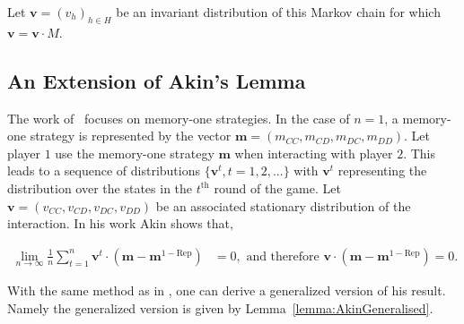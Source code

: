 \documentclass{article}
\theoremstyle{definition}
\begin{document}
Let $\mathbf{v}=(v_h)_{h\in H}$ be an invariant distribution of this Markov
chain for which $\mathbf{v} = \mathbf{v} \cdot M$.


\subsection{An Extension of Akin's Lemma}

The work of~\citep{akin:EGADS:2016} focuses on memory-one strategies. In the
case of $n=1$, a memory-one strategy is represented by the vector
\(\mathbf{m}=(m_{CC}, m_{CD}, m_{DC}, m_{DD})\). Let player $1$ use the
memory-one strategy $\mathbf{m}$ when interacting with player $2$. This leads to
a sequence of distributions \(\{\mathbf{v}^{t}, t = 1, 2, ...\}\) with
\(\mathbf{v}^{t}\) representing the distribution over the states in the
\(t^{\text{th}}\) round of the game. Let $\mathbf{v} = (v_{CC}, v_{CD}, v_{DC}, v_{DD})$ be an associated
stationary distribution of the interaction. In his work Akin shows that,

\begin{align}
  \lim_{n \rightarrow \infty} \frac{1}{n} \sum_{t=1}^{n} \mathbf{v}^{t} \cdot (\mathbf{m} - \mathbf{m}^{1-\text{Rep}}) & = 0, \text{ and therefore } \mathbf{v} \cdot (\mathbf{m} - \mathbf{m}^{1-\text{Rep}}) = 0.
\end{align}

With the same method as in \citep{akin:EGADS:2016}, one can derive a generalized
version of his result. Namely the generalized version is given by
Lemma~\ref{lemma:AkinGeneralised}.
\end{document}
